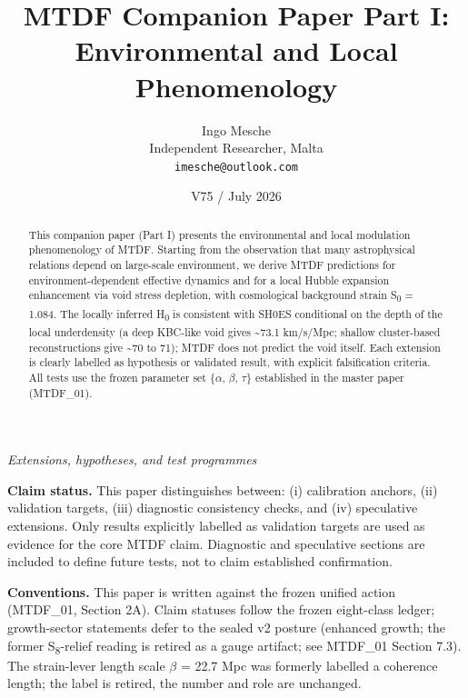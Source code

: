\documentclass[11pt,a4paper]{article}
\title{MTDF Companion Paper Part I: Environmental and Local Phenomenology}
\author{Ingo Mesche\\ \small Independent Researcher, Malta \\ \small \texttt{imesche@outlook.com}}
\date{V75 / July 2026}
\begin{document}
\maketitle
\begin{center}\itshape Extensions, hypotheses, and test programmes\end{center}



\tableofcontents

\begin{abstract}
This companion paper (Part I) presents the environmental and local modulation phenomenology of MTDF. Starting from the observation that many astrophysical relations depend on large-scale environment, we derive MTDF predictions for environment-dependent effective dynamics and for a local Hubble expansion enhancement via void stress depletion, with cosmological background strain S\textsubscript{0} = 1.084. The locally inferred H\textsubscript{0} is consistent with SH0ES conditional on the depth of the local underdensity (a deep KBC-like void gives \~{}73.1 km/\allowbreak{}s/\allowbreak{}Mpc; shallow cluster-based reconstructions give \~{}70 to 71); MTDF does not predict the void itself. Each extension is clearly labelled as hypothesis or validated result, with explicit falsification criteria. All tests use the frozen parameter set \{$\alpha$, $\beta$, $\tau$\} established in the master paper (MTDF\_\allowbreak{}01).
\end{abstract}

\begin{mdframed}[linecolor=accent,linewidth=0.5pt,backgroundcolor=callout-bg,leftline=true,rightline=true,topline=true,bottomline=true,innerleftmargin=8pt,innerrightmargin=8pt,innertopmargin=6pt,innerbottommargin=6pt]
\textbf{Claim status.}
This paper distinguishes between:
(i) calibration anchors,
(ii) validation targets,
(iii) diagnostic consistency checks, and
(iv) speculative extensions.
Only results explicitly labelled as validation targets are used as evidence for the core MTDF claim. Diagnostic and speculative sections are included to define future tests, not to claim established confirmation.

\textbf{Conventions.} This paper is written against the frozen unified action (MTDF\_\allowbreak{}01, Section 2A). Claim statuses follow the frozen eight-class ledger; growth-sector statements defer to the sealed v2 posture (enhanced growth; the former S\textsubscript{8}-relief reading is retired as a gauge artifact; see MTDF\_\allowbreak{}01 Section 7.3). The strain-lever length scale $\beta$ = 22.7 Mpc was formerly labelled a coherence length; the label is retired, the number and role are unchanged.
\end{mdframed}
\end{document}
